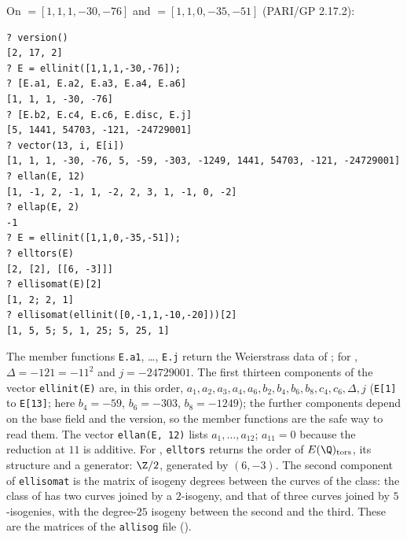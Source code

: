 \begin{sloppypar}
\begin{example}\label{ex:computation:first-session}
On  $=[1,1,1,-30,-76]$ and  $=[1,1,0,-35,-51]$ (PARI/GP 2.17.2):
\begin{lstlisting}[language=GP]
? version()
[2, 17, 2]
? E = ellinit([1,1,1,-30,-76]);
? [E.a1, E.a2, E.a3, E.a4, E.a6]
[1, 1, 1, -30, -76]
? [E.b2, E.c4, E.c6, E.disc, E.j]
[5, 1441, 54703, -121, -24729001]
? vector(13, i, E[i])
[1, 1, 1, -30, -76, 5, -59, -303, -1249, 1441, 54703, -121, -24729001]
? ellan(E, 12)
[1, -1, 2, -1, 1, -2, 2, 3, 1, -1, 0, -2]
? ellap(E, 2)
-1
? E = ellinit([1,1,0,-35,-51]);
? elltors(E)
[2, [2], [[6, -3]]]
? ellisomat(E)[2]
[1, 2; 2, 1]
? ellisomat(ellinit([0,-1,1,-10,-20]))[2]
[1, 5, 5; 5, 1, 25; 5, 25, 1]
\end{lstlisting}
The member functions \texttt{E.a1}, \dots, \texttt{E.j} return the Weierstrass data of ; for , $\Delta=-121=-11^2$ and
$j=-24729001$. The first thirteen components of the vector \texttt{ellinit(E)} are, in this order, $a_1,a_2,a_3,a_4,a_6,b_2,b_4,b_6,b_8,c_4,c_6,\Delta,j$
(\texttt{E[1]} to \texttt{E[13]}; here $b_4=-59$, $b_6=-303$, $b_8=-1249$); the further components depend on the base field and the version, so the
member functions are the safe way to read them. The vector \texttt{ellan(E, 12)} lists $a_1,\dots,a_{12}$; $a_{11}=0$ because the reduction at $11$ is additive. For
, \texttt{elltors} returns the order of $E(\Q)_{\mathrm{tors}}$, its structure and a generator: $\Z/2$, generated by $(6,-3)$.
The second component of \texttt{ellisomat} is the matrix of isogeny degrees between the curves of the class: the class of 
has two curves joined by a $2$-isogeny, and that of  three curves joined by $5$-isogenies, with the degree-$25$ isogeny between
the second and the third. These are the matrices of the \texttt{allisog} file ().
\end{example}


\end{sloppypar}
